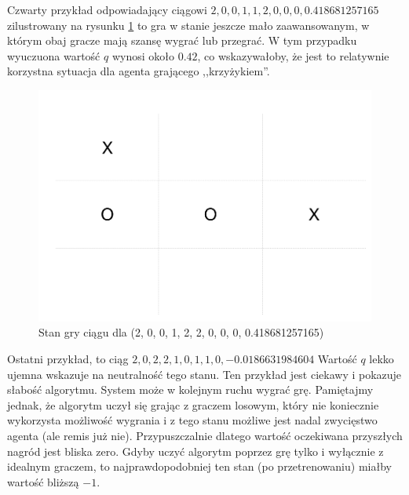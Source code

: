 \documentclass[licencjacka]{pracamgr}
\begin{document}
Czwarty przykład odpowiadający ciągowi $2, 0, 0, 1, 1, 2, 0, 0, 0, 0.418681257165$  zilustrowany na rysunku \ref{Rys12} to gra w stanie jeszcze mało zaawansowanym, w którym obaj gracze mają szansę wygrać lub przegrać. W tym przypadku wyuczuona wartość $q$ wynosi około $0.42$, co wskazywałoby, że jest to relatywnie korzystna sytuacja dla agenta grającego ,,krzyżykiem''.

\begin{figure}[h!]
	\includegraphics [scale=0.22] {ttt_4.png}
	\caption{Stan gry ciągu dla (2, 0, 0, 1, 2, 2, 0, 0, 0, 0.418681257165)}
	\label{Rys12}
\end{figure}


Ostatni przykład, to ciąg $ 2, 0, 2, 2, 1, 0, 1, 1, 0, -0.0186631984604$ Wartość $q$ lekko ujemna wskazuje na neutralność tego stanu. Ten przykład jest ciekawy i pokazuje słabość algorytmu. System może w kolejnym ruchu wygrać grę. Pamiętajmy jednak, że algorytm uczył się grając z graczem losowym, który nie koniecznie wykorzysta możliwość wygrania i z tego stanu możliwe jest nadal zwycięstwo agenta (ale remis już nie). Przypuszczalnie dlatego wartość oczekiwana przyszłych nagród jest bliska zero. Gdyby uczyć algorytm poprzez grę tylko i wyłącznie z idealnym graczem, to najprawdopodobniej ten stan (po przetrenowaniu) miałby wartość bliższą $-1$.
\end{document}
